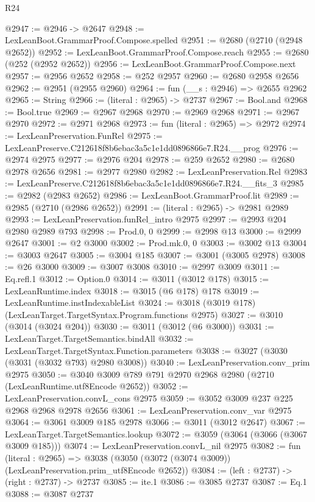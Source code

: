 \begin{lexlean}{R24}
\begin{coremodule}
@2947 := @2946 -> @2647
@2948 := LexLeanBoot.GrammarProof.Compose.spelled
@2951 := @2680 (@2710 (@2948 @2652))
@2952 := LexLeanBoot.GrammarProof.Compose.reach
@2955 := @2680 (@252 (@2952 @2652))
@2956 := LexLeanBoot.GrammarProof.Compose.next
@2957 := @2956 @2652
@2958 := @252 @2957
@2960 := @2680 @2958 @2656
@2962 := @2951 (@2955 @2960)
@2964 := fun (__s : @2946) => @2655 @2962
@2965 := String
@2966 := (literal : @2965) -> @2737
@2967 := Bool.and
@2968 := Bool.true
@2969 := @2967 @2968
@2970 := @2969 @2968
@2971 := @2967 @2970
@2972 := @2971 @2968
@2973 := fun (literal : @2965) => @2972
@2974 := LexLeanPreservation.FunRel
@2975 := LexLeanPreserve.C212618f8b6ebac3a5c1e1dd0896866e7.R24.__prog
@2976 := @2974 @2975
@2977 := @2976 @204
@2978 := @259 @2652
@2980 := @2680 @2978 @2656
@2981 := @2977 @2980
@2982 := LexLeanPreservation.Rel
@2983 := LexLeanPreserve.C212618f8b6ebac3a5c1e1dd0896866e7.R24.__fits_3
@2985 := @2982 (@2983 @2652)
@2986 := LexLeanBoot.GrammarProof.lit
@2989 := @2985 (@2710 (@2986 @2652))
@2991 := (literal : @2965) -> @2981 @2989
@2993 := LexLeanPreservation.funRel_intro @2975
@2997 := @2993 @204 @2980 @2989 @793
@2998 := Prod.{0, 0}
@2999 := @2998 @13
@3000 := @2999 @2647
@3001 := @2 @3000
@3002 := Prod.mk.{0, 0}
@3003 := @3002 @13
@3004 := @3003 @2647
@3005 := @3004 @185
@3007 := @3001 (@3005 @2978)
@3008 := @26 @3000
@3009 := @3007 @3008
@3010 := @2997 @3009
@3011 := Eq.refl.{1}
@3012 := Option.{0}
@3014 := @3011 (@3012 @178)
@3015 := LexLeanRuntime.index
@3018 := @3015 (@6 @178) @178
@3019 := LexLeanRuntime.instIndexableList
@3024 := @3018 (@3019 @178) (LexLeanTarget.TargetSyntax.Program.functions @2975)
@3027 := @3010 (@3014 (@3024 @204))
@3030 := @3011 (@3012 (@6 @3000))
@3031 := LexLeanTarget.TargetSemantics.bindAll
@3032 := LexLeanTarget.TargetSyntax.Function.parameters
@3038 := @3027 (@3030 (@3031 (@3032 @793) @2980 @3008))
@3040 := LexLeanPreservation.conv_prim @2975
@3050 := @3040 @3009 @789 @791 @2970 @2968 @2980 (@2710 (LexLeanRuntime.utf8Encode @2652))
@3052 := LexLeanPreservation.convL_cons @2975
@3059 := @3052 @3009 @237 @225 @2968 @2968 @2978 @2656
@3061 := LexLeanPreservation.conv_var @2975
@3064 := @3061 @3009 @185 @2978
@3066 := @3011 (@3012 @2647)
@3067 := LexLeanTarget.TargetSemantics.lookup
@3072 := @3059 (@3064 (@3066 (@3067 @3009 @185)))
@3074 := LexLeanPreservation.convL_nil @2975
@3082 := fun (literal : @2965) =>
  @3038 (@3050 (@3072 (@3074 @3009)) (LexLeanPreservation.prim_utf8Encode @2652))
@3084 := (left : @2737) -> (right : @2737) -> @2737
@3085 := ite.{1}
@3086 := @3085 @2737
@3087 := Eq.{1}
@3088 := @3087 @2737

\end{coremodule}
\end{lexlean}
